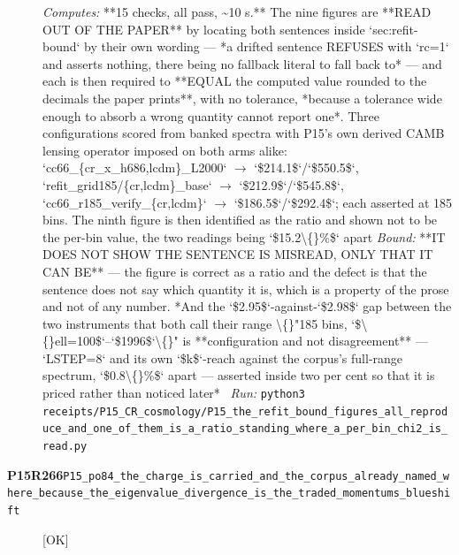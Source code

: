\begin{description}
\emph{Computes:} **15 checks, all pass, \textasciitilde{}10 s.** The nine figures are **READ OUT OF THE PAPER** by locating both sentences inside `sec:refit-bound` by their own wording --- *a drifted sentence REFUSES with `rc=1` and asserts nothing, there being no fallback literal to fall back to* --- and each is then required to **EQUAL the computed value rounded to the decimals the paper prints**, with no tolerance, *because a tolerance wide enough to absorb a wrong quantity cannot report one*. Three configurations scored from banked spectra with P15's own derived CAMB lensing operator imposed on both arms alike: `cc66\_\{cr\_x\_h686,lcdm\}\_L2000` \ensuremath{\to} `\$214.1\$`/`\$550.5\$`, `refit\_grid185/\{cr,lcdm\}\_base` \ensuremath{\to} `\$212.9\$`/`\$545.8\$`, `cc66\_r185\_verify\_\{cr,lcdm\}` \ensuremath{\to} `\$186.5\$`/`\$292.4\$`; each asserted at 185 bins. The ninth figure is then identified as the ratio and shown not to be the per-bin value, the two readings being `\$15.2\textbackslash\{\}\%\$` apart
 \emph{Bound:}  **IT DOES NOT SHOW THE SENTENCE IS MISREAD, ONLY THAT IT CAN BE** --- the figure is correct as a ratio and the defect is that the sentence does not say which quantity it is, which is a property of the prose and not of any number.  *And the `\$2.95\$`-against-`\$2.98\$` gap between the two instruments that both call their range \textbackslash\{\}"185 bins, `\$\textbackslash\{\}ell=100\$`--`\$1996\$`\textbackslash\{\}" is **configuration and not disagreement** --- `LSTEP=8` and its own `\$k\$`-reach against the corpus's full-range spectrum, `\$0.8\textbackslash\{\}\%\$` apart --- asserted inside two per cent so that it is priced rather than noticed later*
\ \emph{Run:} \texttt{python3 receipts/P15\_CR\_cosmology/P15\_the\_refit\_bound\_figures\_all\_reproduce\_and\_one\_of\_them\_is\_a\_ratio\_standing\_where\_a\_per\_bin\_chi2\_is\_read.py}
\item[\rcptlabel{P15_po84_the_charge_is_carried_and_the_corpus_already_named_where_because_the_eigenvalue_divergence_is_the_traded_momentums_blueshift}{P15R266}\textbf{P15R266}\quad\texttt{P15\_po84\_the\_charge\_is\_carried\_and\_the\_corpus\_already\_named\_where\_because\_the\_eigenvalue\_divergence\_is\_the\_traded\_momentums\_blueshift}]\hfill\textsf{[OK]}\\

\end{description}
